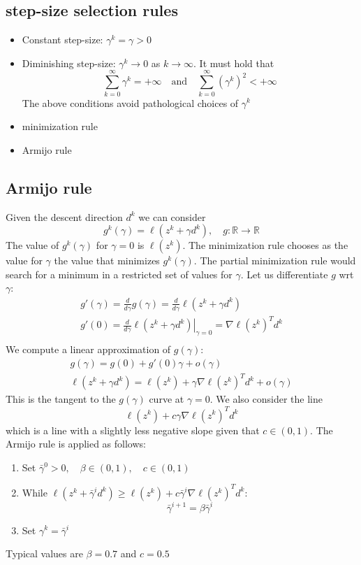 \documentclass[openany]{book}
\newcommand\at[2]{\left.#1\right|_{#2}} %
\newcommand{\R}{\mathbb{R}} %
\theoremstyle{definition}
\theoremstyle{remark}
\begin{document}
\subsection{step-size selection rules}
\begin{itemize}
    \item Constant step-size: $\gamma^k=\gamma>0$
    \item Diminishing step-size: $\gamma^k\to 0$ as $k\to\infty$. It must hold that \[
            \displaystyle\sum_{k=0}^{\infty}\gamma^k = +\infty \quad \text{and} \quad \displaystyle\sum_{k=0}^{\infty}(\gamma^k)^2 < +\infty
        \]
        The above conditions avoid pathological choices of $\gamma^k$
    \item minimization rule
    \item Armijo rule
\end{itemize}

\subsection{Armijo rule}
Given the descent direction $d^k$ we can consider 
\[
    g^k(\gamma) = \ell(z^k+\gamma d^k), \quad g:\R\to\R
\]
The value of $g^k(\gamma)$ for $\gamma=0$ is $\ell(z^k)$. The minimization rule chooses as the value for $\gamma$ the value that minimizes $g^k(\gamma)$. The partial minimization rule would search for a minimum in a restricted set of values for $\gamma$. Let us differentiate $g$ wrt $\gamma$:
\begin{gather*}
    g'(\gamma)=\displaystyle\frac{d}{d\gamma}g(\gamma)=\displaystyle\frac{d}{d\gamma}\ell(z^k+\gamma d^k)\\
    g'(0) = \displaystyle\frac{d}{d\gamma}\at{\ell(z^k+\gamma d^k)}{\gamma=0} = \nabla \ell(z^k)^Td^k\\
\end{gather*}
We compute a linear approximation of $g(\gamma)$:
\begin{gather*}
    g(\gamma) = g(0) + g'(0)\gamma+o(\gamma)\\
    \ell(z^k+\gamma d^k) = \ell(z^k)+\gamma \nabla\ell(z^k)^Td^k + o(\gamma)
\end{gather*}
This is the tangent to the $g(\gamma)$ curve at $\gamma=0$. We also consider the line 
\[
    \ell(z^k)+c\gamma\nabla\ell(z^k)^Td^k
\]
which is a line with a slightly less negative slope given that $c\in(0,1)$.
The Armijo rule is applied as follows: 
\begin{enumerate}
    \item Set $\bar{\gamma}^0>0,\quad\beta\in(0,1),\quad c\in(0,1)$
    \item While $\ell(z^k+\bar{\gamma}^id^k)\geq \ell(z^k)+c\bar{\gamma}^i\nabla\ell(z^k)^Td^k$:
        \[
            \bar{\gamma}^{i+1}=\beta\bar{\gamma}^i
        \]
    \item Set $\gamma^k = \bar{\gamma}^i$
\end{enumerate}
Typical values are $\beta=0.7$ and $c=0.5$
\end{document}
